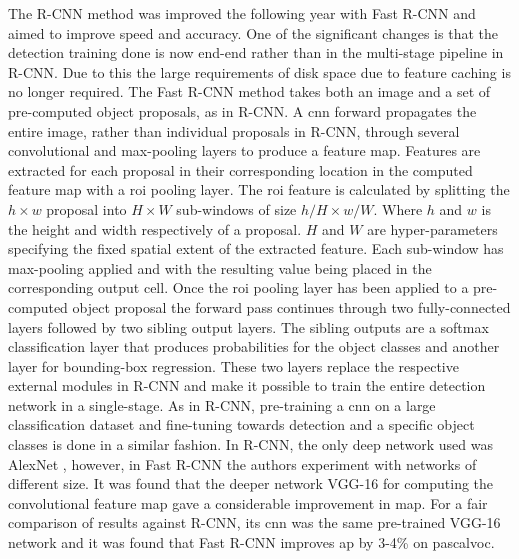 The R-CNN method was improved the following year with Fast R-CNN \cite{fastrcnn} and aimed to improve speed and accuracy. One of the significant changes is that the detection training done is now end-end rather than in the multi-stage pipeline in R-CNN. Due to this the large requirements of disk space due to feature caching is no longer required. The Fast R-CNN method takes both an image and a set of pre-computed object proposals, as in R-CNN. A \gls{cnn} forward propagates the entire image, rather than individual proposals in R-CNN, through several convolutional and max-pooling layers to produce a feature map. Features are extracted for each proposal in their corresponding location in the computed feature map with a \gls{roi} pooling layer. The \gls{roi} feature is calculated by splitting the $h \times w$ proposal into $H \times W$ sub-windows of size $h/H \times w/W$. Where $h$ and $w$ is the height and width respectively of a proposal. $H$ and $W$ are hyper-parameters specifying the fixed spatial extent of the extracted feature. Each sub-window has max-pooling applied and with the resulting value being placed in the corresponding output cell. Once the \gls{roi} pooling layer has been applied to a pre-computed object proposal the forward pass continues through two fully-connected layers followed by two sibling output layers. The sibling outputs are a softmax classification layer that produces probabilities for the object classes and another layer for bounding-box regression. These two layers replace the respective external modules in R-CNN and make it possible to train the entire detection network in a single-stage. As in R-CNN, pre-training a \gls{cnn} on a large classification dataset and fine-tuning towards detection and a specific object classes is done in a similar fashion. In R-CNN, the only deep network used was AlexNet \cite{alexnet}, however, in Fast R-CNN the authors experiment with networks of different size. It was found that the deeper network VGG-16 \cite{vgg16} for computing the convolutional feature map gave a considerable improvement in \gls{map}. For a fair comparison of results against R-CNN, its \gls{cnn} was the same pre-trained VGG-16 network and it was found that Fast R-CNN improves \gls{ap} by 3-4\% on \gls{pascalvoc}.
\begin{comment}
	\begin{table}[]
	\centering
	\caption{A comparison of R-CNN and Fast R-CNN \gls{pascalvoc} \gls{map} results on the test set from 2007, 2010, and 2012.}
	\label{tab:fastresults}
	\begin{tabular}{|l|l|l|l|}
	 \hline
	           & 2007 & 2010 & 2012 \\ \hline
	R-CNN      & 66.0 & 62.9 & 62.4 \\ 
	Fast R-CNN & \textbf{66.9} & \textbf{66.1} & \textbf{65.7} \\ \hline
	\end{tabular}
	\end{table}
\end{comment}

